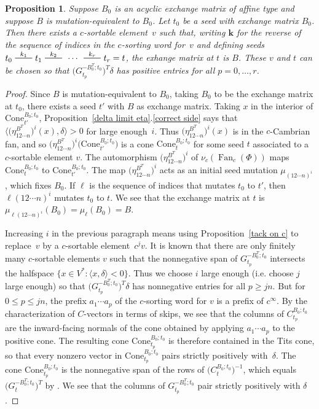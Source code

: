 \documentclass{amsart}
\newtheorem{proposition}{Proposition}[section]
\theoremstyle{definition}
\theoremstyle{remark}
\numberwithin{equation}{section}
\newcommand{\edge}{\,\,\rule[2.7pt]{20pt}{0.5pt}\,\,}
\newcommand{\set}[1]{{\lbrace #1 \rbrace}}
\newcommand{\br}[1]{{\langle #1 \rangle}}
\newcommand{\0}{{\mathbf{0}}}
\newcommand{\Cone}{\mathrm{Cone}}
\newcommand{\kk}{{\boldsymbol{k}}}
\renewcommand{\ll}{{\boldsymbol\ell}}
\newcommand{\Fan}{\operatorname{Fan}}
\newcommand{\RSChar}{\Phi}
\newcommand{\RS}{\RSChar}
\begin{document}
\begin{proposition}\label{any B is sort}
Suppose $B_0$ is an acyclic exchange matrix of affine type and suppose $B$ is mutation-equivalent to $B_0$.
Let $t_0$ be a seed with exchange matrix $B_0$.
Then there exists a $c$-sortable element~$v$ such that, writing $\kk$ for the \emph{reverse} of the sequence of indices in the $c$-sorting word for~$v$ and defining seeds ${t_0\overset{k_1}{\edge}t_1\overset{k_2}{\edge}\,\cdots\,\overset{k_r}{\edge}t_r=t}$, the exhange matrix at $t$ is $B$.
These $v$ and $t$ can be chosen so that $\bigl(G_{t_p}^{-B_0^T;t_0}\bigr)^T\delta$ has positive entries for all ${p=0,\ldots,r}$.
\end{proposition}
\begin{proof}
Since $B$ is mutation-equivalent to $B_0$, taking $B_0$ to be the exchange matrix at $t_0$, there exists a seed $t'$ with $B$ as exchange matrix.
Taking $x$ in the interior of $\Cone^{B_0;t_0}_{t'}$, Proposition~\ref{delta limit eta}.\ref{correct side} says that $\br{\bigl(\eta_{12\cdots n}^{B^T}\bigr)^i(x),\delta}>0$  for large enough~$i$.
Thus $\bigl(\eta_{12\cdots n}^{B^T}\bigr)^i(x)$ is in the $c$-Cambrian fan, and so $\bigl(\eta_{12\cdots n}^{B^T}\bigr)^i\bigl(\Cone^{B_0;t_0}_{t'}\bigr)$ is a cone $\Cone^{B_0;t_0}_t$ for some seed $t$ associated to a $c$-sortable element $v$.
The automorphism $\bigl(\eta_{12\cdots n}^{B^T}\bigr)^i$ of $\nu_c(\Fan_c(\RS))$ maps $\Cone^{B_0;t_0}_t$ to $\Cone^{B_0;t_0}_{t'}$.
The map $\bigl(\eta_{12\cdots n}^{B^T}\bigr)^i$ acts as an initial seed mutation $\mu_{(12\cdots n)^i}$, which fixes $B_0$.
If $\ll$ is the sequence of indices that mutates $t_0$ to $t'$, then $\ll(12\cdots n)^i$ mutates $t_0$ to $t$.
We see that the exchange matrix at $t$ is $\mu_{\ll(12\cdots n)^i}(B_0)=\mu_\ll(B_0)=B$.

Increasing $i$ in the previous paragraph means using Proposition~\ref{tack on c} to replace~$v$ by a $c$-sortable element~$c^jv$.
It is known \cite[Proposition~4.6]{afframe} that there are only finitely many $c$-sortable elements $v$ such that the nonnegative span of $G_{t_p}^{-B_0^T;t_0}$ intersects the halfspace $\set{x\in V^*:\br{x,\delta}<0}$. 
Thus we choose $i$ large enough (i.e. choose $j$ large enough) so that $\bigl(G_{t_p}^{-B_0^T;t_0}\bigr)^T\delta$ has nonnegative entries for all $p\ge jn$.
But for $0\le p\le jn$, the prefix $a_1\cdots a_p$ of the $c$-sorting word for $v$ is a prefix of $c^\infty$.
By the characterization of $C$-vectors in terms of skips, we see that the columns of $C_{t_p}^{B_0;t_0}$ are the inward-facing normals of the cone obtained by applying $a_1\cdots a_p$ to the positive cone.
The resulting cone $\Cone^{B_0;t_0}_{t_p}$ is therefore contained in the Tits cone,
so that every nonzero vector in $\Cone^{B_0;t_0}_{t_p}$ pairs strictly positively with~$\delta$.
The cone $\Cone^{B_0;t_0}_{t_p}$ is the nonnegative span of the rows of $\bigl(C_t^{B_0;t_0}\bigr)^{-1}$, which equals $\bigl(G_t^{-B_0^T;t_0}\bigr)^T$ by \cite[Theorem~1.2]{NZ}.
We see that the columns of $G_{t_p}^{-B_0^T;t_0}$ pair strictly positively with $\delta$.
\end{proof}
\end{document}
